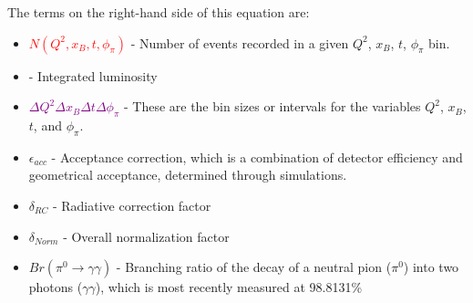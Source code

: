         The terms on the right-hand side of this equation are: 
        \begin{itemize}
        \item \textcolor{red}{$N(Q^2,x_B,t,\phi_{\pi})$} - Number of events recorded in a given $Q^2$, $x_B$, $t$, $\phi_{\pi}$ bin.
        
        \item \Lumiint - Integrated luminosity
        
        \item \textcolor{purple}{$\Delta Q^2 \Delta x_B \Delta t \Delta \phi_{\pi}$} - These are the bin sizes or intervals for the variables $Q^2$, $x_B$, $t$, and $\phi_{\pi}$.
        
        \item \textcolor{correctionfactors}{$\epsilon_{acc}$} - Acceptance correction, which is a combination of detector efficiency and geometrical acceptance, determined through simulations. 
        
        \item \textcolor{correctionfactors}{$\delta_{RC}$} - Radiative correction factor
        
        \item \textcolor{correctionfactors}{$\delta_{Norm}$} - Overall normalization factor
        
        \item \textcolor{correctionfactors}{$Br(\pi^0\rightarrow\gamma\gamma)$} - Branching ratio of the decay of a neutral pion ($\pi^0$) into two photons ($\gamma\gamma$), which is most recently measured at 98.8131\%  \cite{Husek2019PreciseDecay}
        \end{itemize}
        

